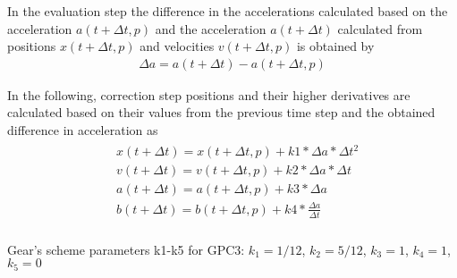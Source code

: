 In the evaluation step the difference in the accelerations calculated based on
the acceleration $a(t+ \Delta{t}, p)$ and the acceleration $a(t+\Delta{t})$
calculated from positions $x(t+\Delta{t}, p)$ and velocities $v(t+\Delta{t}, p)$
is obtained by
\begin{align}\label{eqn:gearDa}
    \Delta{a} = a(t + \Delta{t}) - a(t + \Delta{t}, p)
\end{align}
\par
In the following, correction step positions and their higher derivatives are
calculated based on their values from the previous time step and the obtained
difference in acceleration as
\begin{align}\label{eqn:gearCorrector}
    \begin{split}
        &x(t+\Delta{t}) = x(t+\Delta{t}, p) + k1 * \Delta{a} * \Delta{t}^2\\
        &v(t+\Delta{t}) = v(t+\Delta{t}, p) + k2 * \Delta{a} * \Delta{t}\\
        &a(t+\Delta{t}) = a(t+\Delta{t}, p) + k3 * \Delta{a}\\
        &b(t+\Delta{t}) = b(t+\Delta{t}, p) + k4 * \frac{\Delta{a}}{\Delta{t}}\\
    \end{split}
\end{align}
\par
Gear’s scheme parameters k1-k5 for GPC3:
$k_1=1/12$, $k_2=5/12$, $k_3=1$, $k_4=1$, $k_5=0$\par